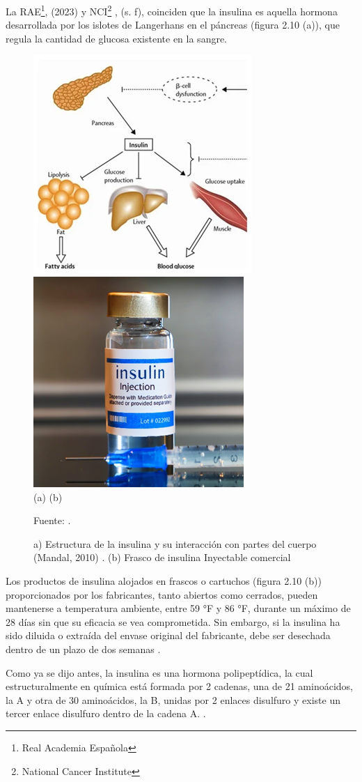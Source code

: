 La RAE\footnote{Real Academia Española}, (2023) y NCI\footnote{National Cancer Institute} , (s. f), coinciden que la insulina es aquella hormona desarrollada por los islotes de Langerhans en el páncreas (figura 2.10 (a)), que regula la cantidad de glucosa existente en la sangre.


\begin{figure}[H]
	\centering
	\includegraphics[width=0.36\linewidth]{figures/structureinsuline}	\includegraphics[width=0.36\linewidth]{figures/insulinbottle}\\
	(a) \hspace*{5cm} (b)
	\caption{a) Estructura de la insulina y su interacción con partes del cuerpo (Mandal, 2010) . (b) Frasco de insulina Inyectable comercial}
	Fuente: \cite{healthcentral2022}. 
	\label{fig:structureinsuline}
\end{figure}

Los productos de insulina alojados en frascos o cartuchos (figura 2.10 (b)) proporcionados por los fabricantes, tanto abiertos como cerrados, pueden mantenerse a temperatura ambiente, entre 59 °F y 86 °F, durante un máximo de 28 días sin que su eficacia se vea comprometida. Sin embargo, si la insulina ha sido diluida o extraída del envase original del fabricante, debe ser desechada dentro de un plazo de dos semanas \cite{research2017}.

Como ya se dijo antes, la insulina es una hormona polipeptídica, la cual estructuralmente en química está formada por 2 cadenas, una de 21 aminoácidos, la A y otra de 30 aminoácidos, la B, unidas por 2 enlaces disulfuro y existe un tercer enlace disulfuro dentro de la cadena A. \cite{gonzalez2017}.



